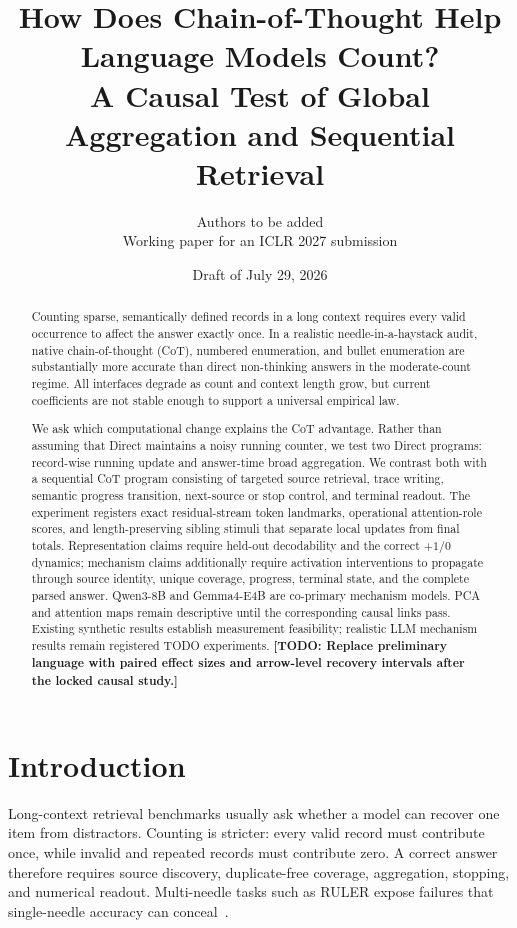 \documentclass[11pt]{article}
\title{How Does Chain-of-Thought Help Language Models Count?\\
A Causal Test of Global Aggregation and Sequential Retrieval}
\author{Authors to be added\\\small Working paper for an ICLR 2027 submission}
\date{Draft of July 29, 2026}
\newcommand{\inlineTODO}[1]{\textcolor{todored}{\textbf{[TODO: #1]}}}
\begin{document}
\maketitle

\begin{abstract}
Counting sparse, semantically defined records in a long context requires every
valid occurrence to affect the answer exactly once. In a realistic
needle-in-a-haystack audit, native chain-of-thought (CoT), numbered
enumeration, and bullet enumeration are substantially more accurate than
direct non-thinking answers in the moderate-count regime. All interfaces
degrade as count and context length grow, but current coefficients are not
stable enough to support a universal empirical law.

We ask which computational change explains the CoT advantage. Rather than
assuming that Direct maintains a noisy running counter, we test two Direct
programs: record-wise running update and answer-time broad aggregation. We
contrast both with a sequential CoT program consisting of targeted
source retrieval, trace writing, semantic progress transition, next-source or
stop control, and terminal readout. The experiment registers exact
residual-stream token landmarks, operational attention-role scores, and
length-preserving sibling stimuli that separate local updates from final
totals. Representation claims require held-out decodability and the correct
\(+1/0\) dynamics; mechanism claims additionally require activation
interventions to propagate through source identity, unique coverage, progress,
terminal state, and the complete parsed answer. Qwen3-8B and Gemma4-E4B are
co-primary mechanism models. PCA and attention maps remain descriptive until
the corresponding causal links pass. Existing synthetic results establish
measurement feasibility; realistic LLM mechanism results remain registered
TODO experiments. \inlineTODO{Replace preliminary language with paired effect
sizes and arrow-level recovery intervals after the locked causal study.}
\end{abstract}

\section{Introduction}

Long-context retrieval benchmarks usually ask whether a model can recover one item from distractors. Counting is stricter: every valid record must contribute once, while invalid and repeated records must contribute zero. A correct answer therefore requires source discovery, duplicate-free coverage, aggregation, stopping, and numerical readout. Multi-needle tasks such as RULER expose failures that single-needle accuracy can conceal~\citep{hsieh2024ruler}.
\end{document}
